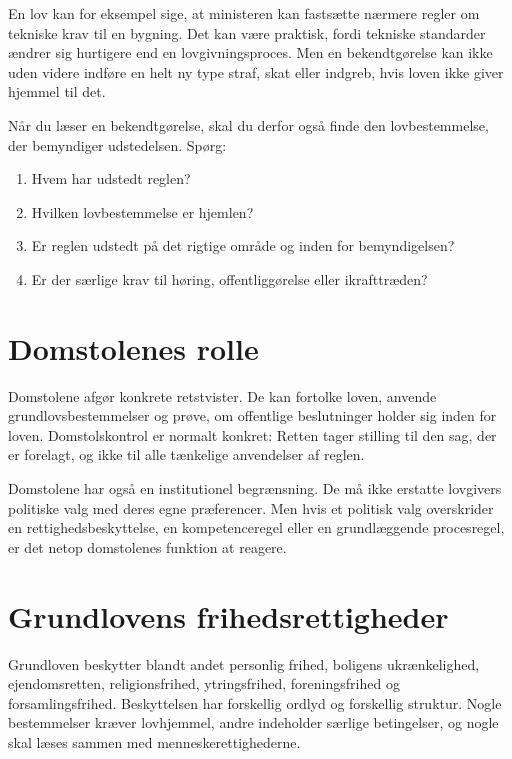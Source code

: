 En lov kan for eksempel sige, at ministeren kan fastsætte nærmere regler om tekniske krav til en bygning. Det kan være praktisk, fordi tekniske standarder ændrer sig hurtigere end en lovgivningsproces. Men en bekendtgørelse kan ikke uden videre indføre en helt ny type straf, skat eller indgreb, hvis loven ikke giver hjemmel til det.

Når du læser en bekendtgørelse, skal du derfor også finde den lovbestemmelse, der bemyndiger udstedelsen. Spørg:

\begin{enumerate}
  \item Hvem har udstedt reglen?
  \item Hvilken lovbestemmelse er hjemlen?
  \item Er reglen udstedt på det rigtige område og inden for bemyndigelsen?
  \item Er der særlige krav til høring, offentliggørelse eller ikrafttræden?
\end{enumerate}

\section{Domstolenes rolle}

Domstolene afgør konkrete retstvister. De kan fortolke loven, anvende grundlovsbestemmelser og prøve, om offentlige beslutninger holder sig inden for loven. Domstolskontrol er normalt konkret: Retten tager stilling til den sag, der er forelagt, og ikke til alle tænkelige anvendelser af reglen.

Domstolene har også en institutionel begrænsning. De må ikke erstatte lovgivers politiske valg med deres egne præferencer. Men hvis et politisk valg overskrider en rettighedsbeskyttelse, en kompetenceregel eller en grundlæggende procesregel, er det netop domstolenes funktion at reagere.

\section{Grundlovens frihedsrettigheder}

Grundloven beskytter blandt andet personlig frihed, boligens ukrænkelighed, ejendomsretten, religionsfrihed, ytringsfrihed, foreningsfrihed og forsamlingsfrihed. Beskyttelsen har forskellig ordlyd og forskellig struktur. Nogle bestemmelser kræver lovhjemmel, andre indeholder særlige betingelser, og nogle skal læses sammen med menneskerettighederne.

